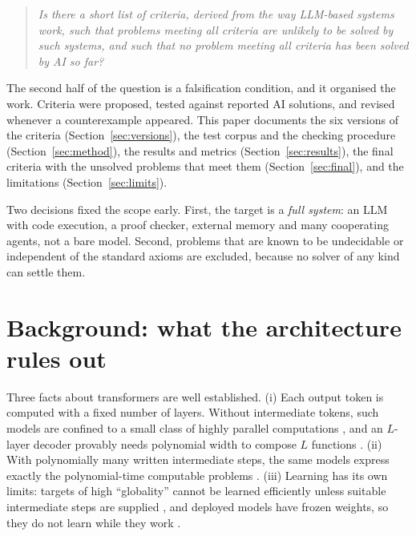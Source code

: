 \documentclass[11pt,a4paper]{article}
\theoremstyle{prob}
\begin{document}
\begin{quote}
\emph{Is there a short list of criteria, derived from the way LLM-based systems work, such that problems meeting all criteria are unlikely to be solved by such systems, and such that no problem meeting all criteria has been solved by AI so far?}
\end{quote}

The second half of the question is a falsification condition, and it organised the work. Criteria were proposed, tested against reported AI solutions, and revised whenever a counterexample appeared. This paper documents the six versions of the criteria (Section~\ref{sec:versions}), the test corpus and the checking procedure (Section~\ref{sec:method}), the results and metrics (Section~\ref{sec:results}), the final criteria with the unsolved problems that meet them (Section~\ref{sec:final}), and the limitations (Section~\ref{sec:limits}).

Two decisions fixed the scope early. First, the target is a \emph{full system}: an LLM with code execution, a proof checker, external memory and many cooperating agents, not a bare model. Second, problems that are known to be undecidable or independent of the standard axioms are excluded, because no solver of any kind can settle them.

\section{Background: what the architecture rules out}\label{sec:background}

Three facts about transformers are well established. (i) Each output token is computed with a fixed number of layers. Without intermediate tokens, such models are confined to a small class of highly parallel computations \cite{ms24,llzm}, and an $L$-layer decoder provably needs polynomial width to compose $L$ functions \cite{cpw}. (ii) With polynomially many written intermediate steps, the same models express exactly the polynomial-time computable problems \cite{ms24}. (iii) Learning has its own limits: targets of high ``globality'' cannot be learned efficiently unless suitable intermediate steps are supplied \cite{abbe}, and deployed models have frozen weights, so they do not learn while they work \cite{jitrl}.
\end{document}
